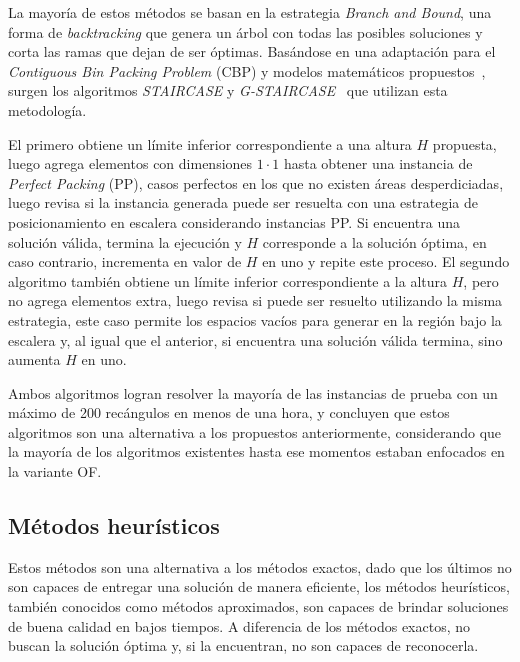 \documentclass[letter, 10pt]{article}
\begin{document}
La mayor\'ia de estos m\'etodos se basan en la estrategia \emph{Branch and Bound}, una forma de \emph{backtracking} que genera un \'arbol con todas las posibles soluciones y corta las ramas que dejan de ser \'optimas. Bas\'andose en una adaptaci\'on para el \emph{Contiguous Bin Packing Problem} (CBP) y modelos matem\'aticos propuestos~\cite{martello2003exact}, surgen los algoritmos \emph{STAIRCASE} y \emph{G-STAIRCASE}~\cite{kenmochi2009exact} que utilizan esta metodolog\'ia.

El primero obtiene un l\'imite inferior correspondiente a una altura $H$ propuesta, luego agrega elementos con dimensiones $1 \cdot 1$ hasta obtener una instancia de \emph{Perfect Packing} (PP), casos perfectos en los que no existen \'areas desperdiciadas, luego revisa si la instancia generada puede ser resuelta con una estrategia de posicionamiento en escalera considerando instancias PP. Si encuentra una soluci\'on v\'alida, termina la ejecuci\'on y $H$ corresponde a la soluci\'on \'optima, en caso contrario, incrementa en valor de $H$ en uno y repite este proceso. El segundo algoritmo tambi\'en obtiene un l\'imite inferior correspondiente a la altura $H$, pero no agrega elementos extra, luego revisa si puede ser resuelto utilizando la misma estrategia, este caso permite los espacios vac\'ios para generar en la regi\'on bajo la escalera y, al igual que el anterior, si encuentra una soluci\'on v\'alida termina, sino aumenta $H$ en uno.

Ambos algoritmos logran resolver la mayor\'ia de las instancias de prueba con un m\'aximo de 200 rec\'angulos en menos de una hora, y concluyen que estos algoritmos son una alternativa a los propuestos anteriormente, considerando que la mayor\'ia de los algoritmos existentes hasta ese momentos estaban enfocados en la variante OF.

\subsection{M\'etodos heur\'isticos}

Estos m\'etodos son una alternativa a los m\'etodos exactos, dado que los \'ultimos no son capaces de entregar una soluci\'on de manera eficiente, los m\'etodos heur\'isticos, tambi\'en conocidos como m\'etodos aproximados, son capaces de brindar soluciones de buena calidad en bajos tiempos. A diferencia de los m\'etodos exactos, no buscan la soluci\'on \'optima y, si la encuentran, no son capaces de reconocerla.
\end{document}
